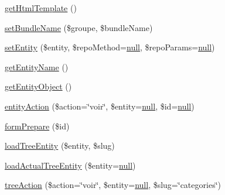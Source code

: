 \begin{DoxyCompactItemize}
\item 
\hyperlink{class_acme_group_1_1_labo_bundle_1_1event_listeners_1_1session_data_1_1out_puts3_a1cf8a1c64b7bb9ac1dd990398e7719e1}{get\+Html\+Template} ()
\item 
\hyperlink{class_acme_group_1_1_labo_bundle_1_1event_listeners_1_1session_data_1_1out_puts3_a8f1ea139bff93f492bee536da78b25e7}{set\+Bundle\+Name} (\$groupe, \$bundle\+Name)
\item 
\hyperlink{class_acme_group_1_1_labo_bundle_1_1event_listeners_1_1session_data_1_1out_puts3_aba199af7bc8d576c0f2d6d6fe8a60470}{set\+Entity} (\$entity, \$repo\+Method=\hyperlink{validate_8js_afb8e110345c45e74478894341ab6b28e}{null}, \$repo\+Params=\hyperlink{validate_8js_afb8e110345c45e74478894341ab6b28e}{null})
\item 
\hyperlink{class_acme_group_1_1_labo_bundle_1_1event_listeners_1_1session_data_1_1out_puts3_ae8fa9689b9750975a57ef2d973fbf365}{get\+Entity\+Name} ()
\item 
\hyperlink{class_acme_group_1_1_labo_bundle_1_1event_listeners_1_1session_data_1_1out_puts3_a0f8e374573aa735c1d9bd73c2485cf4c}{get\+Entity\+Object} ()
\item 
\hyperlink{class_acme_group_1_1_labo_bundle_1_1event_listeners_1_1session_data_1_1out_puts3_a7e6b9b8c85229b3a4f4bff9bc7e027c8}{entity\+Action} (\$action=\char`\"{}voir\char`\"{}, \$entity=\hyperlink{validate_8js_afb8e110345c45e74478894341ab6b28e}{null}, \$id=\hyperlink{validate_8js_afb8e110345c45e74478894341ab6b28e}{null})
\item 
\hyperlink{class_acme_group_1_1_labo_bundle_1_1event_listeners_1_1session_data_1_1out_puts3_a6cfd12b173cdd664c5cad6fc20239633}{form\+Prepare} (\$id)
\item 
\hyperlink{class_acme_group_1_1_labo_bundle_1_1event_listeners_1_1session_data_1_1out_puts3_a83997700fff0fb48bf26c157122ef809}{load\+Tree\+Entity} (\$entity, \$slug)
\item 
\hyperlink{class_acme_group_1_1_labo_bundle_1_1event_listeners_1_1session_data_1_1out_puts3_af2adc2baccc61861bffe4e700a64281e}{load\+Actual\+Tree\+Entity} (\$entity=\hyperlink{validate_8js_afb8e110345c45e74478894341ab6b28e}{null})
\item 
\hyperlink{class_acme_group_1_1_labo_bundle_1_1event_listeners_1_1session_data_1_1out_puts3_a31814b82599fab76a584d65a200c44eb}{tree\+Action} (\$action=\char`\"{}voir\char`\"{}, \$entity=\hyperlink{validate_8js_afb8e110345c45e74478894341ab6b28e}{null}, \$slug=\char`\"{}categories\char`\"{})
\end{DoxyCompactItemize}
